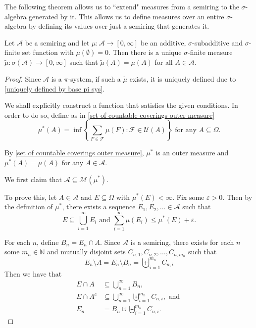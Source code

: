 The following theorem allows us to ``extend" measures from a semiring to the $\sigma$-algebra generated by it. This allows us to define measures over an entire $\sigma$-algebra by defining its values over just a semiring that generates it.

\begin{theorem}
\label{MeasureExtensionTh}
    Let $\mathcal{A}$ be a semiring and let $\mu:\mathcal{A}\to[0,\infty]$ be an additive, $\sigma$-subadditive and $\sigma$-finite set function with $\mu(\emptyset)=0$. Then there is a unique $\sigma$-finite measure $\tilde\mu:\sigma(\mathcal{A})\to[0,\infty]$ such that $\tilde\mu(A)=\mu(A)$ for all $A\in\mathcal{A}$.
\end{theorem}
\begin{proof}
    Since $\mathcal{A}$ is a $\pi$-system, if such a $\tilde\mu$ exists, it is uniquely defined due to \cref{uniquely defined by base pi sys}.
    
    We shall explicitly construct a function that satisfies the given conditions. In order to do so, define as in \cref{set of countable coverings outer measure}
    $$\mu^*(A)=\inf\left\{\sum_{F\in\mathcal{F}}\mu(F) : \mathcal{F}\in\mathcal{U}(A) \right\}\text{ for any $A\subseteq\Omega$.}$$
    
    By \cref{set of countable coverings outer measure}, $\mu^*$ is an outer measure and $\mu^*(A)=\mu(A)$ for any $A\in\mathcal{A}$.
    
    \vspace{2mm}
    We first claim that $\mathcal{A}\subseteq\mathcal{M}(\mu^*)$.
    
    To prove this, let $A\in\mathcal{A}$ and $E\subseteq\Omega$ with $\mu^*(E)<\infty$. Fix some $\varepsilon>0$. Then by the definition of $\mu^*$, there exists a sequence $E_1,E_2,\ldots\in\mathcal{A}$ such that
    $$E\subseteq\bigcup_{i=1}^\infty E_i\text{ and }\sum_{i=1}^\infty \mu(E_i)\leq \mu^*(E)+\varepsilon.$$
    
    For each $n$, define $B_n=E_n\cap A$. Since $\mathcal{A}$ is a semiring, there exists for each $n$ some $m_n\in\mathbb{N}$ and mutually disjoint sets $C_{n, 1},C_{n, 2},\ldots,C_{n, m_n}$ such that
    $$E_n\setminus A = E_n\setminus B_n = \biguplus_{i=1}^{m_n}C_{n, i}$$
    Then we have that
    \begin{align*}
        E\cap A &\subseteq \bigcup_{n=1}^\infty B_n, \\
        E\cap A^c &\subseteq \bigcup_{n=1}^\infty\biguplus_{i=1}^{m_n}C_{n,i},\text{ and } \\
        E_n &= B_n\uplus\biguplus_{i=1}^{m_n}C_{n,i}.
    \end{align*}
    

\end{proof}
